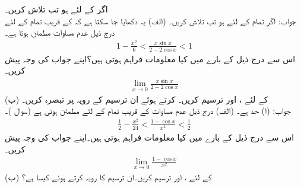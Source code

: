 
اگر  کے لئے  ہو تب  تلاش کریں۔\\
جواب: 
اگر تمام  کے لئے  ہو تب  تلاش کریں۔
(الف) \quad
یہ دکھایا جا سکتا ہے کہ  کے قریب تمام  کے لئے درج ذیل عدم مساوات مطمئن ہوتا ہے۔
\begin{align*}
1-\frac{x^2}{6}<\frac{x\sin x}{2-2\cos x}<1
\end{align*}
اس سے درج ذیل کے بارے میں کیا معلومات فراہم ہوتی ہیں؟اپنے جواب کی وجہ پیش کریں۔
\begin{align*}
\lim_{x\to 0} \frac{x\sin x}{2-2\cos x}
\end{align*}
(ب)\quad
{} کے لئے ،  اور  ترسیم کریں۔  کرتے ہوئے ان  ترسیم کے رویہ پر تبصرہ کریں۔\\
جواب: (ا) حد  ہے۔
(الف) \quad
درج ذیل عدم مساوات  کے قریب تمام  کے لئے مطمئن ہوتی ہے (سوال )۔
\begin{align*}
\frac{1}{2}-\frac{x^2}{24}<\frac{1-\cos x}{x^2}<\frac{1}{2}
\end{align*} 
اس سے درج ذیل کے بارے میں کیا معلومات فراہم ہوتی ہیں۔اپنے جواب کی وجہ پیش کریں۔
\begin{align*}
\lim_{x\to 0}\frac{1-\cos x}{x^2}
\end{align*}
(ب)\quad
{} کے لئے ،  اور  ترسیم کریں۔ان ترسیم کا رویہ   کرتے ہوئے کیسا ہے؟


